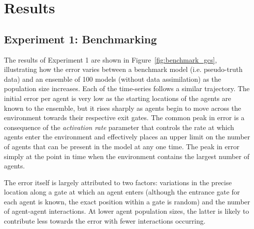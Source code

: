 \documentclass{article}
\begin{document}
\section{Results}\label{sec:results}


\subsection{Experiment 1: Benchmarking}\label{sub:results:bench}

The results of Experiment 1 are shown in Figure~\ref{fig:benchmark_gcs}, illustrating how the error varies between a benchmark model (i.e. pseudo-truth data) and an ensemble of 100 models (without data assimilation) as the population size increases. Each of the time-series follows a similar trajectory. The initial error per agent is very low as the starting locations of the agents are known to the ensemble, but it rises sharply as agents begin to move across the environment towards their respective exit gates. The common peak in error is a consequence of the \textit{activation rate}
parameter that controls the rate at which agents enter the environment and effectively places an upper limit on the number of agents that can be present in the model at any one time. The peak in error simply at the point in time when the environment contains the largest number of agents. 

The error itself is largely attributed to two factors: variations in the precise location along a gate at which an agent enters (although the entrance gate for each agent is known, the exact position within a gate is random) and the number of agent-agent interactions. At lower agent population sizes, the latter is likely to contribute less towards the error with fewer interactions occurring. 

\end{document}
